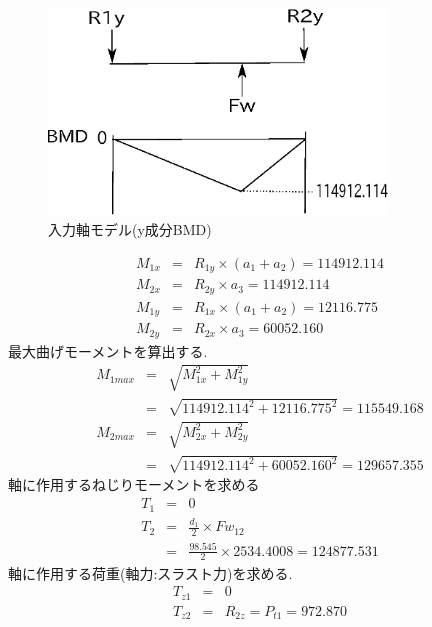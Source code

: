 \documentclass[a4j,twoside,openright,11pt]{jreport}
\begin{document}
\begin{figure}[htbp]
\begin{center}
\includegraphics[width=9cm]{jiku13.eps}
\end{center}
\caption{入力軸モデル(y成分BMD)}
\end{figure}
\begin{eqnarray}
M_{1x} &=& R_{1y} \times (a_1+a_2)=114912.114\\
M_{2x} &=& R_{2y} \times a_3=114912.114\\
M_{1y} &=& R_{1x} \times (a_1+a_2)=12116.775\\
M_{2y} &=& R_{2x} \times a_3=60052.160
\end{eqnarray}
最大曲げモーメントを算出する.
\begin{eqnarray}
M_{1max} &=& \sqrt {M_{1x}^2+M_{1y}^2}\\
         &=& \sqrt {114912.114^2+12116.775^2}=115549.168\\
M_{2max} &=& \sqrt {M_{2x}^2+M_{2y}^2}\\
         &=& \sqrt {114912.114^2+60052.160^2}=129657.355
\end{eqnarray}
軸に作用するねじりモーメントを求める
\begin{eqnarray}
T_{1} &=& 0\\
T_{2} &=& \frac{d_1}{2} \times Fw_{12}\\
      &=& \frac{98.545}{2} \times 2534.4008 = 124877.531
\end{eqnarray}
軸に作用する荷重(軸力:スラスト力)を求める.
\begin{eqnarray}
T_{z1} &=& 0\\
T_{z2} &=& R_{2z} = P_{t1} = 972.870
\end{eqnarray}
\end{document}
